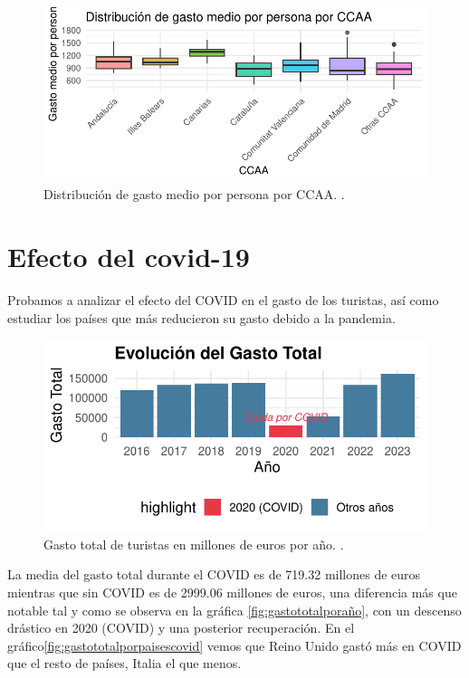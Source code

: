 \documentclass[data,article,submit,moreauthors,pdftex]{Definitions/mdpi}
\begin{document}
\begin{figure}[H]
\includegraphics{ProyectoAED2024_Rmd_files/figure-latex/unnamed-chunk-26-1} \caption{Distribución de gasto medio por persona por CCAA. .\label{fig:cajas}}\label{fig:unnamed-chunk-26}
\end{figure}

\section{Efecto del covid-19}\label{efecto-del-covid-19}

Probamos a analizar el efecto del COVID en el gasto de los turistas, así
como estudiar los países que más reducieron su gasto debido a la
pandemia.

\begin{figure}[H]
\includegraphics{ProyectoAED2024_Rmd_files/figure-latex/gasto total covid-1} \caption{Gasto total de turistas en millones de euros por año. .\label{fig:gastototalporaño}}\label{fig:gasto total covid}
\end{figure}

La media del gasto total durante el COVID es de 719.32 millones de euros
mientras que sin COVID es de 2999.06 millones de euros, una diferencia
más que notable tal y como se observa en la gráfica
\ref{fig:gastototalporaño}, con un descenso drástico en 2020 (COVID) y
una posterior recuperación. En el
gráfico\ref{fig:gastototalporpaisescovid} vemos que Reino Unido gastó
más en COVID que el resto de países, Italia el que menos.
\end{document}
